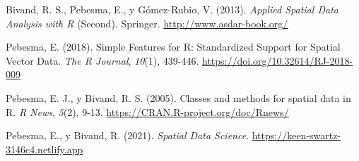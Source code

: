 \documentclass[
]{book}
\newlength{\cslhangindent}
\newenvironment{CSLReferences}[2] %
 {\begin{list}{}{%
  \setlength{\itemindent}{0pt}
  \setlength{\leftmargin}{0pt}
  \setlength{\parsep}{0pt}
  \ifodd #1
   \setlength{\leftmargin}{\cslhangindent}
   \setlength{\itemindent}{-1\cslhangindent}
  \fi
  \setlength{\itemsep}{#2\baselineskip}}}
 {\end{list}}
\theoremstyle{break}
\theoremstyle{definition}
\theoremstyle{definition}
\theoremstyle{definition}
\theoremstyle{definition}
\theoremstyle{remark}
\begin{document}
\label{refs}
\begin{CSLReferences}{1}{0}
Bivand, R. S., Pebesma, E., y Gómez-Rubio, V. (2013). \emph{Applied Spatial Data Analysis with {R}} (Second). Springer. \url{http://www.asdar-book.org/}

Pebesma, E. (2018). {Simple Features for R: Standardized Support for Spatial Vector Data}. \emph{{The R Journal}}, \emph{10}(1), 439-446. \url{https://doi.org/10.32614/RJ-2018-009}

Pebesma, E. J., y Bivand, R. S. (2005). Classes and methods for spatial data in {R}. \emph{R News}, \emph{5}(2), 9-13. \url{https://CRAN.R-project.org/doc/Rnews/}

Pebesma, E., y Bivand, R. (2021). \emph{Spatial Data Science}. \url{https://keen-swartz-3146c4.netlify.app}

\end{CSLReferences}
\end{document}

